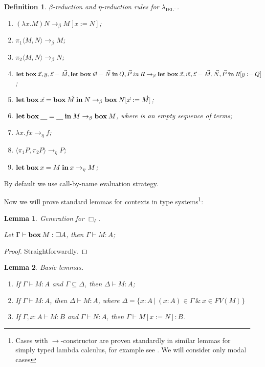 \documentclass[a4paper]{article}
\newtheorem{lemma}{Lemma}
\newtheorem{defin}{Definition}
\begin{document}
  \begin{defin} $\beta$-reduction and $\eta$-reduction rules for $\lambda_{\text{IEL}^{-}}$.

\begin{enumerate}
  \item $(\lambda x. M) N \rightarrow_{\beta} M [x := N]$;
  \item $\pi_1 \langle M, N \rangle \rightarrow_{\beta} M$;
  \item $\pi_2 \langle M, N \rangle \rightarrow_{\beta} N$;
  \item ${\bf let \: box \:} \vec{x}, y, \vec{z} = \vec{M}, {\bf let \: box \: } \vec{w} = \vec{N} {\: \bf in \: } Q, \vec{P} {\: in \:} R \rightarrow_{\beta} \\
  {\bf let \: box \:} \vec{x}, \vec{w}, \vec{z} = \vec{M}, \vec{N}, \vec{P} {\: \bf in \: } R [y := Q]$;
  \item ${\bf let \: box \:} \vec{x} = {\bf box \:} \vec{M} {\: \bf in \:} N \rightarrow_{\beta} {\bf box \:} N [\vec{x} := \vec{M}]$;
  \item ${\bf let \: box \:} \underline{\quad} = \underline{\quad} {\: \bf in \:} M \rightarrow_{\beta} {\bf box \:} M$, where \underline{\quad} is an empty sequence of terms;
  \item $\lambda x. f x \rightarrow_{\eta} f$;
  \item $\langle \pi_1 P, \pi_2 P \rangle \rightarrow_{\eta} P$;
  \item ${\bf let \: box \:} x = M {\: \bf in \: } x \rightarrow_{\eta} M$;
\end{enumerate}
  \end{defin}

By default we use call-by-name evaluation strategy.

Now we will prove standard lemmas for contexts in type systems\footnote{Cases with
$\to$-constructor are proven standardly in similar lemmas for simply typed lambda calculus, for
example see \cite{Neder} \cite{Morten} \cite{Pierce}. We will consider only modal cases}:

\begin{lemma} Generation for $\Box_I$.

  Let $\Gamma \vdash {\bf box \:} M : \Box A$, then $\Gamma \vdash M : A$;
\end{lemma}

\begin{proof}
  Straightforwardly.
\end{proof}

\begin{lemma} Basic lemmas.

\begin{enumerate}
  \item If $\Gamma \vdash M : A$ and $\Gamma \subseteq \Delta$, then $\Delta \vdash M : A$;
  \item If $\Gamma \vdash M : A$, then $\Delta \vdash M : A$, where $\Delta = \{ x : A \: | \: (x : A) \in \Gamma \: \& \: x \in FV(M) \}$
  \item If $\Gamma, x : A \vdash M : B$ and $\Gamma \vdash N : A$, then $\Gamma \vdash M [x := N] : B$.
\end{enumerate}
\end{lemma}
\end{document}
